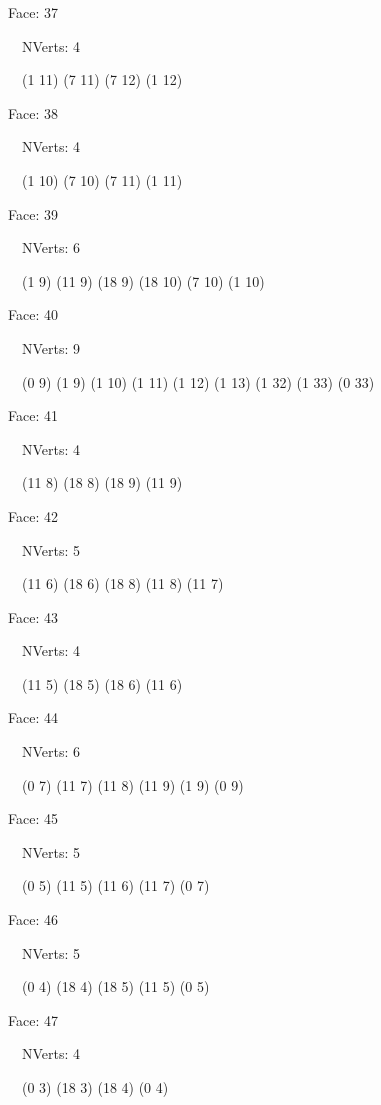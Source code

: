 \documentclass{article}
\begin{document}
{\footnotesize 

Face: 37

\   \    NVerts: 4

 \   \   (1 11) (7 11) (7 12) (1 12)}

{\footnotesize 

Face: 38

\   \    NVerts: 4

 \   \   (1 10) (7 10) (7 11) (1 11)}

{\footnotesize 

Face: 39

\   \    NVerts: 6

 \   \   (1 9) (11 9) (18 9) (18 10) (7 10) (1 10)}

{\footnotesize 

Face: 40

\   \    NVerts: 9

 \   \   (0 9) (1 9) (1 10) (1 11) (1 12) (1 13) (1 32) (1 33) (0 33)}

{\footnotesize 

Face: 41

\   \    NVerts: 4

 \   \   (11 8) (18 8) (18 9) (11 9)}

{\footnotesize 

Face: 42

\   \    NVerts: 5

 \   \   (11 6) (18 6) (18 8) (11 8) (11 7)}

{\footnotesize 

Face: 43

\   \    NVerts: 4

 \   \   (11 5) (18 5) (18 6) (11 6)}

{\footnotesize 

Face: 44

\   \    NVerts: 6

 \   \   (0 7) (11 7) (11 8) (11 9) (1 9) (0 9)}

{\footnotesize 

Face: 45

\   \    NVerts: 5

 \   \   (0 5) (11 5) (11 6) (11 7) (0 7)}

{\footnotesize 

Face: 46

\   \    NVerts: 5

 \   \   (0 4) (18 4) (18 5) (11 5) (0 5)}

{\footnotesize 

Face: 47

\   \    NVerts: 4

 \   \   (0 3) (18 3) (18 4) (0 4)}
\end{document}
